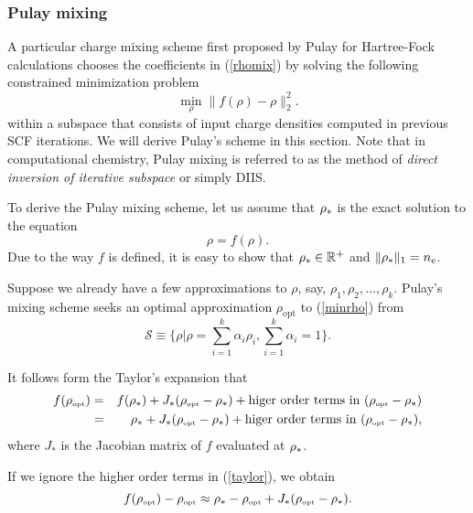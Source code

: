 \documentclass[11pt]{book}
\newcommand{\rhostar} {\rho_{\tiny \ast}}
\newcommand{\rhoopt} {\rho_{\tiny \mbox{opt}}}
\begin{document}
\subsubsection{Pulay mixing}
A particular charge mixing scheme first proposed by Pulay
for Hartree-Fock calculations \cite{pulay:80,pulay:82} 
chooses the coefficients in (\ref{rhomix}) by solving 
the following constrained minimization problem 
\begin{equation}
\min_{\rho} \| f(\rho) - \rho \|_2^2.
\label{minrho}
\end{equation}
within a subspace that consists of input charge densities computed in previous
SCF iterations.  We will derive Pulay's scheme in this section. 
Note that in computational chemistry, Pulay mixing is referred to as 
the method of {\em direct inversion of iterative subspace} or simply DIIS.  

To derive the Pulay mixing scheme, let us assume that 
$\rhostar$ is the exact solution to the equation
\begin{equation}
\rho = f(\rho). 
\label{fixpt}
\end{equation}
Due to the way $f$ is defined, it is easy to show that
$\rhostar \in  \mathbb{R}^+$ and $\|\rhostar\|_1 = n_e$.

Suppose we already have a few approximations to $\rho$, say, 
$\rho_1, \rho_2, ...,\rho_k$.  Pulay's mixing scheme seeks an optimal 
approximation $\rho_{\mbox{opt}}$ to (\ref{minrho}) from 
\begin{equation}
{\mathcal S} \equiv \{ \rho | \rho = \sum_{i=1}^k\alpha_i\rho_i, \sum_{i=1}^k \alpha_i = 1\}.
\label{subspace}
\end{equation}

It follows form the Taylor's expansion that
\begin{eqnarray}
f(\rhoopt) &=& f(\rhostar) + J_{\ast}(\rhoopt-\rhostar) +
\mbox{higer order terms in } (\rhoopt - \rhostar) \\
           &=& \rhostar + J_{\ast}(\rhoopt-\rhostar) +
\mbox{higer order terms in } (\rhoopt - \rhostar),
\label{taylor}
\end{eqnarray}
where $J_{\ast}$ is the Jacobian matrix of $f$ evaluated at $\rhostar$.

If we ignore the higher order terms in (\ref{taylor}), we obtain
\begin{equation}
f(\rhoopt) - \rhoopt \approx \rhostar- \rhoopt+J_{\ast}(\rhoopt -\rhostar).
\label{approx1st}
\end{equation}
\end{document}
